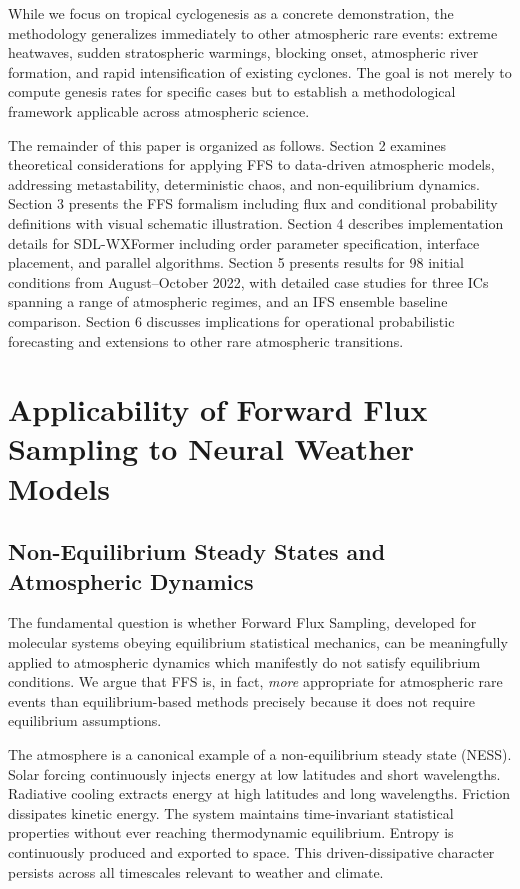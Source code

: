 \documentclass[11pt]{article}
\begin{document}
While we focus on tropical cyclogenesis as a concrete demonstration, the methodology generalizes immediately to other atmospheric rare events: extreme heatwaves, sudden stratospheric warmings, blocking onset, atmospheric river formation, and rapid intensification of existing cyclones. The goal is not merely to compute genesis rates for specific cases but to establish a methodological framework applicable across atmospheric science.

The remainder of this paper is organized as follows. Section 2 examines theoretical considerations for applying FFS to data-driven atmospheric models, addressing metastability, deterministic chaos, and non-equilibrium dynamics. Section 3 presents the FFS formalism including flux and conditional probability definitions with visual schematic illustration. Section 4 describes implementation details for SDL-WXFormer including order parameter specification, interface placement, and parallel algorithms. Section 5 presents results for 98 initial conditions from August--October 2022, with detailed case studies for three ICs spanning a range of atmospheric regimes, and an IFS ensemble baseline comparison. Section 6 discusses implications for operational probabilistic forecasting and extensions to other rare atmospheric transitions.
\section{Applicability of Forward Flux Sampling to Neural Weather Models}

\subsection{Non-Equilibrium Steady States and Atmospheric Dynamics}

The fundamental question is whether Forward Flux Sampling, developed for molecular systems obeying equilibrium statistical mechanics, can be meaningfully applied to atmospheric dynamics which manifestly do not satisfy equilibrium conditions. We argue that FFS is, in fact, \textit{more} appropriate for atmospheric rare events than equilibrium-based methods precisely because it does not require equilibrium assumptions.

The atmosphere is a canonical example of a non-equilibrium steady state (NESS). Solar forcing continuously injects energy at low latitudes and short wavelengths. Radiative cooling extracts energy at high latitudes and long wavelengths. Friction dissipates kinetic energy. The system maintains time-invariant statistical properties without ever reaching thermodynamic equilibrium. Entropy is continuously produced and exported to space. This driven-dissipative character persists across all timescales relevant to weather and climate.
\end{document}
